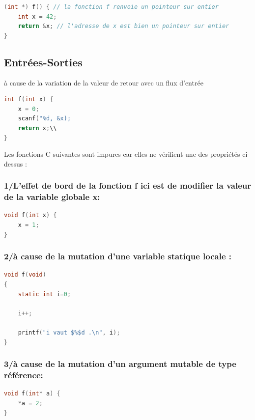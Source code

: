 \documentclass[12pt,titlepage]{article}
\begin{document}
\begin{lstlisting}[language=c]
(int *) f() { // la fonction f renvoie un pointeur sur entier
    int x = 42;
    return &x; // l'adresse de x est bien un pointeur sur entier
}
\end{lstlisting}

\subsection{Entrées-Sorties}

à cause de la variation de la valeur de retour avec un flux d'entrée

\begin{lstlisting}[language=c]
int f(int x) {
    x = 0;
    scanf("%d, &x);
    return x;\\
}
\end{lstlisting}

Les fonctions C suivantes sont impures car elles ne vérifient une des propriétés ci-dessus :

\subsubsection{1/L'effet de bord de la fonction f ici est de modifier la valeur de la variable globale x:}

\begin{lstlisting}[language=c]
void f(int x) {
    x = 1;
}
\end{lstlisting}

\subsubsection{ 2/à cause de la mutation d'une variable statique locale :}

\begin{lstlisting}[language=c]
void f(void)
{
    static int i=0; 

    i++;
    
    printf("i vaut $%$d .\n", i);
}
\end{lstlisting}



\subsubsection{3/à cause de la mutation d'un argument mutable de type référence:}

\begin{lstlisting}[language=c]
void f(int* a) {
    *a = 2;
}
\end{lstlisting}
\end{document}
